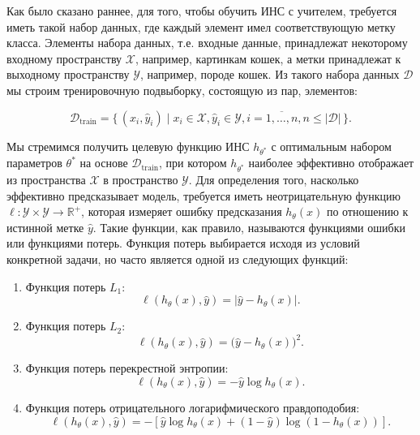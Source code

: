 Как было сказано раннее, для того, чтобы обучить ИНС с учителем, требуется иметь такой набор данных, где каждый элемент имел соответствующую метку класса. Элементы набора данных, т.е. входные данные, принадлежат некоторому входному пространству $\mathcal{X}$, например, картинкам кошек, а метки принадлежат к выходному пространству $\mathcal{Y}$, например, породе кошек. Из такого набора данных $\mathcal{D}$ мы строим тренировочную подвыборку, состоящую из пар, элементов:

\begin{equation}
    \mathcal{D}_{\text{train}} = \{\,(x_i, \hat y_i) \mid x_i \in \mathcal{X}, \hat y_i \in \mathcal{Y}, i=\overline{1, \dots, n}, n \le \lvert \mathcal{D} \rvert\,\}.
\end{equation}

Мы стремимся получить целевую функцию ИНС $h_{\theta^*}$ с оптимальным набором параметров $\theta^*$ на основе $\mathcal{D}_{\text{train}}$, при котором $h_{\theta^*}$ наиболее эффективно отображает из пространства $\mathcal{X}$ в пространство $\mathcal{Y}$. Для определения того, насколько эффективно предсказывает модель, требуется иметь неотрицательную функцию $\ell: \mathcal{Y} \times \mathcal{Y} \rightarrow \mathbb{R}^+$, которая измеряет ошибку предсказания $h_{\theta}(x)$ по отношению к истинной метке $\hat y$. Такие функции, как правило, называются функциями ошибки или функциями потерь. Функция потерь выбирается исходя из условий конкретной задачи, но часто является одной из следующих функций:
\begin{enumerate}
    \item Функция потерь $L_1$:
          \begin{equation}
              \ell\left(h_\theta(x), \hat y\right) = \lvert \hat y - h_\theta(x) \rvert.
          \end{equation}
    \item Функция потерь $L_2$:
          \begin{equation}
              \ell\left(h_\theta(x), \hat y\right) = \big(\hat y - h_\theta(x)\big)^2.
          \end{equation}
    \item Функция потерь перекрестной энтропии:
          \begin{equation}
              \ell\left(h_\theta(x), \hat y\right) = - \hat y\log{h_\theta(x)}.
          \end{equation}
    \item Функция потерь отрицательного логарифмического правдоподобия:
          \begin{equation}
              \ell\left(h_\theta(x), \hat y\right) = -\left[\hat y \log{h_\theta(x)} + (1 - \hat y)\log(1 - h_\theta(x))\right].
          \end{equation}
\end{enumerate}


